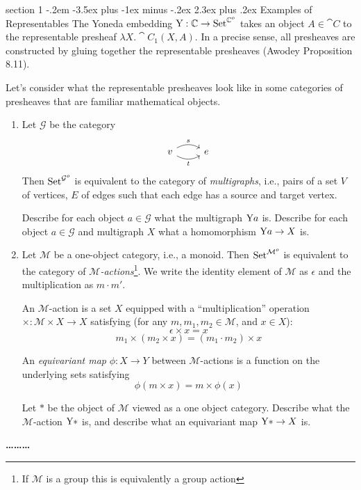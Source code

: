 \documentclass[12pt]{article}
\makeatletter
\newenvironment{problem}{\@startsection
       {section}
       {1}
       {-.2em}
       {-3.5ex plus -1ex minus -.2ex}
       {2.3ex plus .2ex}
       {\pagebreak[3]%
       \large\bf\noindent{Problem }
       }
       }
       {%
       \begin{center}\large\bf \ldots\ldots\ldots\end{center}}
\makeatother
\begin{document}
\begin{problem}{Examples of Representables}
  The Yoneda embedding $\textrm{Y} : \mathbb C \to \textrm{Set}^{\mathbb C^o}$ takes an
  object $A \in \cat C$ to the representable presheaf $\lambda X. \cat
  C_1(X,A)$. In a precise sense, all presheaves are constructed by
  gluing together the representable presheaves (Awodey Proposition
  8.11).

  Let's consider what the representable presheaves look
  like in some categories of presheaves that are familiar mathematical
  objects.

  \begin{enumerate}
  \item Let $\mathcal G$ be the category
    \[%
    \begin{tikzcd}
      v \arrow[r, "s", bend left] \arrow[r, "t"', bend right] & e
    \end{tikzcd}\]
    Then $\textrm{Set}^{\mathcal G^o}$ is equivalent to the category of
    \emph{multigraphs}, i.e., pairs of a set $V$ of vertices, $E$ of
    edges such that each edge has a source and target vertex.

    Describe for each object $a \in \mathcal G$ what the multigraph
    $\textrm{Y} a$ is. Describe for each object $a \in \mathcal G$ and
    multigraph $X$ what a homomorphism $\textrm{Y} a \to X$ is.

  \item Let $\mathcal M$ be a one-object category, i.e., a
    monoid. Then $\textrm{Set}^{\mathcal M^o}$ is equivalent to the category
    of \emph{$\mathcal M$-actions}\footnote{If $\mathcal M$ is a group
    this is equivalently a group action}. We write the identity
    element of $\mathcal M$ as $\epsilon$ and the multiplication as $m
    \cdot m'$.

    An $\mathcal M$-action is a set
    $X$ equipped with a ``multiplication'' operation $\times :
    \mathcal M \times X \to X$ satisfying (for any $m, m_1,m_2 \in
    \mathcal M$, and $x \in X$):
    \[ \epsilon \times x = x \]
    \[ m_1 \times (m_2 \times x) = (m_1 \cdot m_2) \times x \]

    An \emph{equivariant map} $\phi : X \to Y$ between $\mathcal
    M$-actions is a function on the underlying sets satisfying
    \[ \phi(m \times x) = m \times \phi(x) \]

    Let $*$ be the object of $\mathcal M$ viewed as a one object
    category. Describe what the $\mathcal M$-action $\textrm{Y} *$ is, and
    describe what an equivariant map $\textrm{Y} * \to X$ is.


\end{enumerate}
\end{problem}
\end{document}
